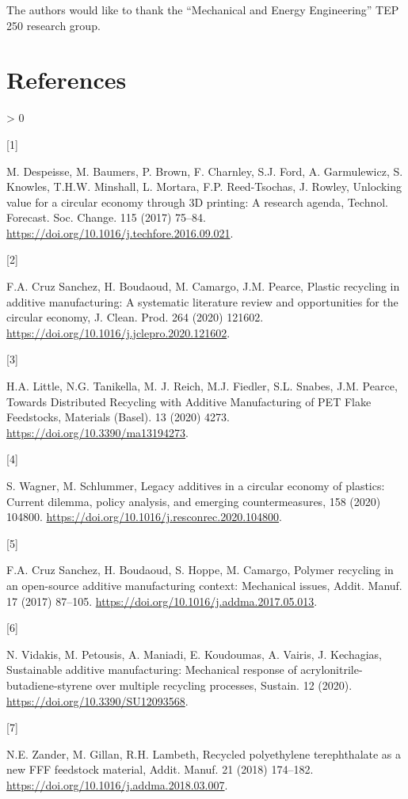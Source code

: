 \documentclass[]{elsarticle} %
\newlength{\csllabelwidth}
\newlength{\cslhangindent}
\newenvironment{CSLReferences}[3] %
 {%
  \setlength{\parindent}{0pt}
  \ifodd #1 \everypar{\setlength{\hangindent}{\cslhangindent}}\ignorespaces\fi
  \ifnum #2 > 0
  \setlength{\parskip}{#2\baselineskip}
  \fi
 }%
 {}
\newcommand{\CSLLeftMargin}[1]{\parbox[t]{\csllabelwidth}{#1}}
\newcommand{\CSLRightInline}[1]{\parbox[t]{\linewidth - \csllabelwidth}{#1}}
\begin{document}
The authors would like to thank the ``Mechanical and Energy
Engineering'' TEP 250 research group.

\hypertarget{references}{%
\section*{References}\label{references}}

\hypertarget{refs}{}
\begin{CSLReferences}{0}{0}
\leavevmode\hypertarget{ref-Despeisse2016}{}%
\CSLLeftMargin{{[}1{]} }
\CSLRightInline{M. Despeisse, M. Baumers, P. Brown, F. Charnley, S.J.
Ford, A. Garmulewicz, S. Knowles, T.H.W. Minshall, L. Mortara, F.P.
Reed-Tsochas, J. Rowley, {Unlocking value for a circular economy through
3D printing: A research agenda}, Technol. Forecast. Soc. Change. 115
(2017) 75--84. \url{https://doi.org/10.1016/j.techfore.2016.09.021}.}

\leavevmode\hypertarget{ref-CruzSanchez2020}{}%
\CSLLeftMargin{{[}2{]} }
\CSLRightInline{F.A. Cruz Sanchez, H. Boudaoud, M. Camargo, J.M. Pearce,
{Plastic recycling in additive manufacturing: A systematic literature
review and opportunities for the circular economy}, J. Clean. Prod. 264
(2020) 121602. \url{https://doi.org/10.1016/j.jclepro.2020.121602}.}

\leavevmode\hypertarget{ref-Little2020}{}%
\CSLLeftMargin{{[}3{]} }
\CSLRightInline{H.A. Little, N.G. Tanikella, M. J. Reich, M.J. Fiedler,
S.L. Snabes, J.M. Pearce, {Towards Distributed Recycling with Additive
Manufacturing of PET Flake Feedstocks}, Materials (Basel). 13 (2020)
4273. \url{https://doi.org/10.3390/ma13194273}.}

\leavevmode\hypertarget{ref-Wagner2020}{}%
\CSLLeftMargin{{[}4{]} }
\CSLRightInline{S. Wagner, M. Schlummer, {Legacy additives in a circular
economy of plastics: Current dilemma, policy analysis, and emerging
countermeasures}, 158 (2020) 104800.
\url{https://doi.org/10.1016/j.resconrec.2020.104800}.}

\leavevmode\hypertarget{ref-CruzSanchez2017}{}%
\CSLLeftMargin{{[}5{]} }
\CSLRightInline{F.A. Cruz Sanchez, H. Boudaoud, S. Hoppe, M. Camargo,
{Polymer recycling in an open-source additive manufacturing context:
Mechanical issues}, Addit. Manuf. 17 (2017) 87--105.
\url{https://doi.org/10.1016/j.addma.2017.05.013}.}

\leavevmode\hypertarget{ref-Vidakis2020}{}%
\CSLLeftMargin{{[}6{]} }
\CSLRightInline{N. Vidakis, M. Petousis, A. Maniadi, E. Koudoumas, A.
Vairis, J. Kechagias, {Sustainable additive manufacturing: Mechanical
response of acrylonitrile-butadiene-styrene over multiple recycling
processes}, Sustain. 12 (2020).
\url{https://doi.org/10.3390/SU12093568}.}

\leavevmode\hypertarget{ref-Zander2018}{}%
\CSLLeftMargin{{[}7{]} }
\CSLRightInline{N.E. Zander, M. Gillan, R.H. Lambeth, {Recycled
polyethylene terephthalate as a new FFF feedstock material}, Addit.
Manuf. 21 (2018) 174--182.
\url{https://doi.org/10.1016/j.addma.2018.03.007}.}

\end{CSLReferences}
\end{document}
